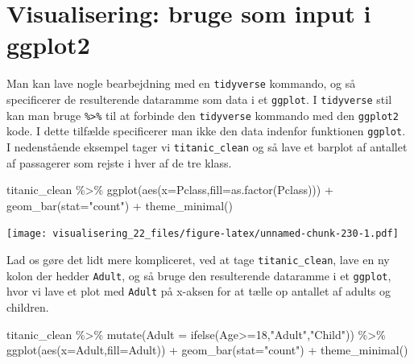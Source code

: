 \documentclass[
]{book}
\newenvironment{Shaded}{\begin{snugshade}}{\end{snugshade}}
\newcommand{\AttributeTok}[1]{\textcolor[rgb]{0.77,0.63,0.00}{#1}}
\newcommand{\DecValTok}[1]{\textcolor[rgb]{0.00,0.00,0.81}{#1}}
\newcommand{\FunctionTok}[1]{\textcolor[rgb]{0.00,0.00,0.00}{#1}}
\newcommand{\NormalTok}[1]{#1}
\newcommand{\SpecialCharTok}[1]{\textcolor[rgb]{0.00,0.00,0.00}{#1}}
\newcommand{\StringTok}[1]{\textcolor[rgb]{0.31,0.60,0.02}{#1}}
\begin{document}
\hypertarget{visualisering-bruge-som-input-i-ggplot2}{%
\section{Visualisering: bruge som input i ggplot2}\label{visualisering-bruge-som-input-i-ggplot2}}

Man kan lave nogle bearbejdning med en \texttt{tidyverse} kommando, og så specificerer de resulterende dataramme som data i et \texttt{ggplot}. I \texttt{tidyverse} stil kan man bruge \texttt{\%\textgreater{}\%} til at forbinde den \texttt{tidyverse} kommando med den \texttt{ggplot2} kode. I dette tilfælde specificerer man ikke den data indenfor funktionen \texttt{ggplot}. I nedenstående eksempel tager vi \texttt{titanic\_clean} og så lave et barplot af antallet af passagerer som rejste i hver af de tre klass.

\begin{Shaded}
\begin{Highlighting}[]
\NormalTok{titanic\_clean }\SpecialCharTok{\%\textgreater{}\%} 
  \FunctionTok{ggplot}\NormalTok{(}\FunctionTok{aes}\NormalTok{(}\AttributeTok{x=}\NormalTok{Pclass,}\AttributeTok{fill=}\FunctionTok{as.factor}\NormalTok{(Pclass))) }\SpecialCharTok{+} 
  \FunctionTok{geom\_bar}\NormalTok{(}\AttributeTok{stat=}\StringTok{"count"}\NormalTok{) }\SpecialCharTok{+}
  \FunctionTok{theme\_minimal}\NormalTok{()}
\end{Highlighting}
\end{Shaded}

\texttt{[image: visualisering\_22\_files/figure-latex/unnamed-chunk-230-1.pdf]}

Lad os gøre det lidt mere kompliceret, ved at tage \texttt{titanic\_clean}, lave en ny kolon der hedder \texttt{Adult}, og så bruge den resulterende dataramme i et \texttt{ggplot}, hvor vi lave et plot med \texttt{Adult} på x-aksen for at tælle op antallet af adults og children.

\begin{Shaded}
\begin{Highlighting}[]
\NormalTok{titanic\_clean }\SpecialCharTok{\%\textgreater{}\%} 
   \FunctionTok{mutate}\NormalTok{(}\AttributeTok{Adult =} \FunctionTok{ifelse}\NormalTok{(Age}\SpecialCharTok{\textgreater{}=}\DecValTok{18}\NormalTok{,}\StringTok{"Adult"}\NormalTok{,}\StringTok{"Child"}\NormalTok{)) }\SpecialCharTok{\%\textgreater{}\%} 
   \FunctionTok{ggplot}\NormalTok{(}\FunctionTok{aes}\NormalTok{(}\AttributeTok{x=}\NormalTok{Adult,}\AttributeTok{fill=}\NormalTok{Adult)) }\SpecialCharTok{+} 
   \FunctionTok{geom\_bar}\NormalTok{(}\AttributeTok{stat=}\StringTok{"count"}\NormalTok{) }\SpecialCharTok{+} 
   \FunctionTok{theme\_minimal}\NormalTok{()}
\end{Highlighting}
\end{Shaded}
\end{document}
